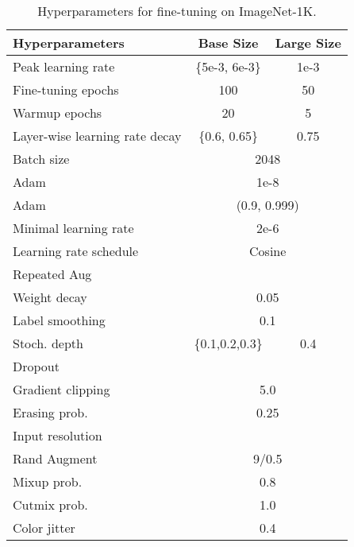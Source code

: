 \documentclass{article}
\newcommand{\xmark}{\ding{55}}
\begin{document}
\begin{table}[H]
    \centering
    \caption{
    Hyperparameters for fine-tuning on ImageNet-1K.
    }
    \begin{tabular}{l|cc}
    \toprule
    \bf Hyperparameters & \bf Base Size & \bf Large Size \\
    \toprule
    Peak learning rate & {\{5e-3, 6e-3\}} & 1e-3 \\ 
    Fine-tuning epochs & 100 & 50 \\
    Warmup epochs  & 20 & 5 \\
    Layer-wise learning rate decay & {\{0.6, 0.65\}} & 0.75 \\
    Batch size & \multicolumn{2}{c}{2048} \\
    Adam  & \multicolumn{2}{c}{1e-8}  \\
    Adam  & \multicolumn{2}{c}{(0.9, 0.999)} \\
    Minimal learning rate & \multicolumn{2}{c}{2e-6} \\
    Learning rate schedule & \multicolumn{2}{c}{Cosine} \\
    \midrule
    Repeated Aug & \multicolumn{2}{c}{\xmark} \\
    Weight decay & \multicolumn{2}{c}{0.05} \\
    Label smoothing  & \multicolumn{2}{c}{0.1}     \\
    Stoch. depth & \{0.1,0.2,0.3\} & 0.4 \\
    Dropout & \multicolumn{2}{c}{\xmark} \\
    Gradient clipping & \multicolumn{2}{c}{5.0} \\
    \midrule
    Erasing prob.  & \multicolumn{2}{c}{0.25} \\
    Input resolution & \multicolumn{2}{c}{} \\
    Rand Augment  & \multicolumn{2}{c}{9/0.5} \\
    Mixup prob.  & \multicolumn{2}{c}{0.8}     \\
    Cutmix prob.   & \multicolumn{2}{c}{1.0}    \\
    Color jitter & \multicolumn{2}{c}{0.4} \\
    \bottomrule
    \end{tabular}
    \label{tab:appd-hyper-finetune}
\end{table}
\end{document}
